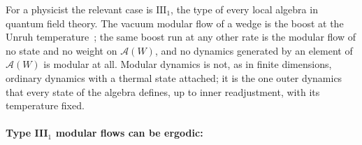 \documentclass[a4paper,11pt]{article}
\theoremstyle{definition}
\newcommand{\mE}{\mathcal{E}}
\begin{document}
For a physicist the relevant case is $\mathrm{III}_1$, the type of every local algebra in quantum field theory. The vacuum modular flow of a wedge is the boost at the Unruh temperature~\cite{BisognanoWichmann1975}; the same boost run at any other rate is the modular flow of no state and no weight on $\mathcal A(W)$, and no dynamics generated by an element of $\mathcal A(W)$ is modular at all. Modular dynamics is not, as in finite dimensions, ordinary dynamics with a thermal state attached; it is the one outer dynamics that every state of the algebra defines, up to inner readjustment, with its temperature fixed.





\paragraph{Type III$_1$ modular flows can be ergodic:}
\end{document}
